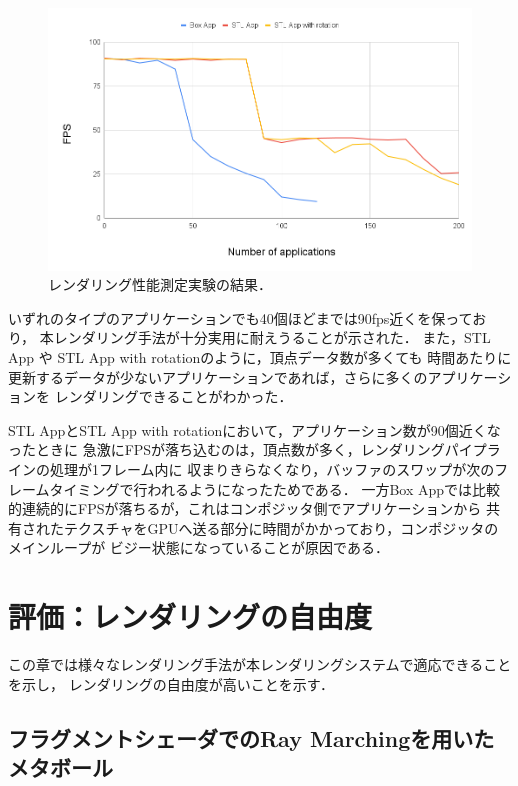 \begin{figure}[htbp]
  \centering
  \includegraphics[keepaspectratio, width=\linewidth]{figures/rendering-fps.png}
  \caption{
    レンダリング性能測定実験の結果．
  }
  \label{fig:rendering-fps}
\end{figure}

いずれのタイプのアプリケーションでも40個ほどまでは90fps近くを保っており，
本レンダリング手法が十分実用に耐えうることが示された．
また，STL App や STL App with rotationのように，頂点データ数が多くても
時間あたりに更新するデータが少ないアプリケーションであれば，さらに多くのアプリケーションを
レンダリングできることがわかった．

STL AppとSTL App with rotationにおいて，アプリケーション数が90個近くなったときに
急激にFPSが落ち込むのは，頂点数が多く，レンダリングパイプラインの処理が1フレーム内に
収まりきらなくなり，バッファのスワップが次のフレームタイミングで行われるようになったためである．
一方Box Appでは比較的連続的にFPSが落ちるが，これはコンポジッタ側でアプリケーションから
共有されたテクスチャをGPUへ送る部分に時間がかかっており，コンポジッタのメインループが
ビジー状態になっていることが原因である．

\section{評価：レンダリングの自由度}

この章では様々なレンダリング手法が本レンダリングシステムで適応できることを示し，
レンダリングの自由度が高いことを示す．

\subsection{フラグメントシェーダでのRay Marchingを用いたメタボール}

